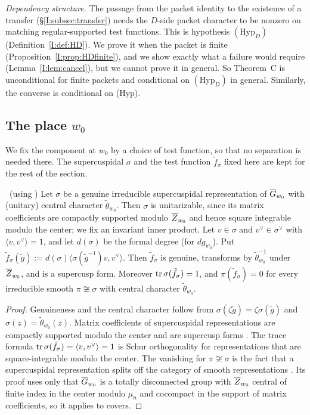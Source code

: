 \emph{Dependency structure.} The passage from the packet identity to the existence of a transfer (\S\ref{I:subsec:transfer}) needs the $D$-side packet character to be nonzero on matching regular-supported test functions. This is hypothesis $(\mathrm{Hyp}_D)$ (Definition~\ref{I:def:HD}). We prove it when the packet is finite (Proposition~\ref{I:prop:HDfinite}), and we show exactly what a failure would require (Lemma~\ref{I:lem:cancel}), but we cannot prove it in general. So Theorem~C is unconditional for finite packets and conditional on $(\mathrm{Hyp}_D)$ in general. Similarly, the converse is conditional on (Hyp).

\subsection{The place $w_0$}\label{I:subsec:w0}
We fix the component at $w_0$ by a choice of test function, so that no separation is needed there. The supercuspidal $\sigma$ and the test function $\tilde f_\sigma$ fixed here are kept for the rest of the section.

\begin{lemma}\label{I:lem:supercusp}\ (using \Ev)
Let $\sigma$ be a genuine irreducible supercuspidal representation of $\overline{G}_{w_0}$ with (unitary) central character $\tilde\theta_{w_0}$. Then $\sigma$ is unitarizable, since its matrix coefficients are compactly supported modulo $\overline{Z}_{w_0}$ and hence square integrable modulo the center; we fix an invariant inner product. Let $v\in\sigma$ and $v^\vee\in\sigma^\vee$ with $\langle v,v^\vee\rangle=1$, and let $d(\sigma)$ be the formal degree (for $dg_{w_0}$). Put $\tilde f_\sigma(\tilde g):=d(\sigma)\langle\sigma(\tilde g^{-1})v,v^\vee\rangle$. Then $\tilde f_\sigma$ is genuine, transforms by $\tilde\theta_{w_0}^{-1}$ under $\overline{Z}_{w_0}$, and is a supercusp form. Moreover $\operatorname{tr}\sigma(\tilde f_\sigma)=1$, and $\pi(\tilde f_\sigma)=0$ for every irreducible smooth $\pi\not\cong\sigma$ with central character $\tilde\theta_{w_0}$.
\end{lemma}
\begin{proof}
Genuineness and the central character follow from $\sigma(\zeta\tilde g)=\zeta\sigma(\tilde g)$ and $\sigma(z)=\tilde\theta_{w_0}(z)$. Matrix coefficients of supercuspidal representations are compactly supported modulo the center and are supercusp forms \cite[\S13]{FK86} \Ev. The trace formula $\operatorname{tr}\sigma(\tilde f_\sigma)=\langle v,v^\vee\rangle=1$ is Schur orthogonality for representations that are square-integrable modulo the center. The vanishing for $\pi\not\cong\sigma$ is the fact that a supercuspidal representation splits off the category of smooth representations \cite[BZ]{Ber84} \Ev. Its proof uses only that $\overline{G}_{w_0}$ is a totally disconnected group with $\overline{Z}_{w_0}$ central of finite index in the center modulo $\mu_n$ and cocompact in the support of matrix coefficients, so it applies to covers.
\end{proof}


